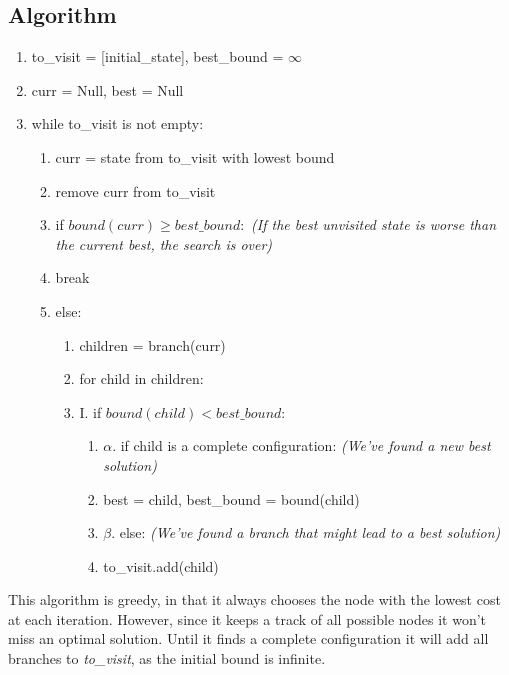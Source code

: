 \newpage
\subsection{Algorithm}
\begin{enumerate}[label=\Alph*]
\item to\_visit = [initial\_state], best\_bound = $\infty$
\item curr = Null, best = Null
\item while to\_visit is not empty:
\begin{enumerate}[label=\arabic*]
    \item curr = state from to\_visit with lowest bound
    \item remove curr from to\_visit
    \item if $bound(curr)\geq best\_bound:$ \emph{(If the best unvisited state is worse than the current best, the search is over)}
    \item [] \quad \quad break
    \item else:
    \begin{enumerate}
        \item children = branch(curr)
        \item for child in children:
            \item []\quad I. if $bound(child) < best\_bound:$
            \begin{enumerate}
                \item [] $\alpha$. if child is a complete configuration: \emph{(We've found a new best solution)}
                \item [] \quad \quad best = child, best\_bound = bound(child)
                \item [] $\beta$. else: \emph{(We've found a branch that might lead to a best solution)}
                \item [] \quad \quad to\_visit.add(child)
            \end{enumerate}
    \end{enumerate}
\end{enumerate}
\end{enumerate}
This algorithm is greedy, in that it always chooses the node with the lowest cost at each iteration. However, since it keeps a track of all possible nodes it won't miss an optimal solution. Until it finds a complete configuration it will add all branches to \emph{to\_visit}, as the initial bound is infinite.


